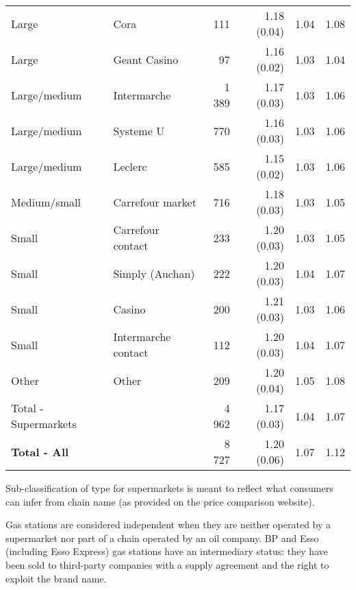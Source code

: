 \documentclass[english]{article}
\begin{document}
\begin{table}
\begin{threeparttable}
\begin{tabular}{lrrrrr}
    Large & \multicolumn{1}{l}{Cora} & 111   & 1.18 (0.04) & 1.04  & 1.08 \\
    Large & \multicolumn{1}{l}{Geant Casino} & 97    & 1.16 (0.02) & 1.03  & 1.04 \\
    Large/medium & \multicolumn{1}{l}{Intermarche} & 1 389 & 1.17 (0.03) & 1.03  & 1.06 \\
    Large/medium & \multicolumn{1}{l}{Systeme U} & 770   & 1.16 (0.03) & 1.03  & 1.06 \\
    Large/medium & \multicolumn{1}{l}{Leclerc} & 585   & 1.15 (0.02) & 1.03  & 1.06 \\
    Medium/small & \multicolumn{1}{l}{Carrefour market} & 716   & 1.18 (0.03) & 1.03  & 1.05 \\
    Small & \multicolumn{1}{l}{Carrefour contact} & 233   & 1.20 (0.03) & 1.03  & 1.05 \\
    Small & \multicolumn{1}{l}{Simply (Auchan)} & 222   & 1.20 (0.03) & 1.04  & 1.07 \\
    Small & \multicolumn{1}{l}{Casino} & 200   & 1.21 (0.03) & 1.03  & 1.06 \\
    Small & \multicolumn{1}{l}{Intermarche contact} & 112   & 1.20 (0.03) & 1.04  & 1.07 \\
    Other & \multicolumn{1}{l}{Other} & 209   & 1.20 (0.04) & 1.05  & 1.08 \\
    \midrule
    Total - Supermarkets &       & 4 962 & 1.17 (0.03) & 1.04  & 1.07 \\
    \midrule
    \textbf{Total - All} &       & 8 727 & 1.20 (0.06) & 1.07 & 1.12 \\
    \bottomrule

    \bottomrule
\end{tabular}
\begin{tablenotes}
			\small
			\item Sub-classification of type for supermarkets is meant to reflect what consumers can infer from chain name (as provided on the price comparison website).
      \item Gas stations are considered independent when they are neither operated by a supermarket nor part of a chain operated by an oil company. BP and Esso (including Esso Express) gas stations  have an intermediary status: they have been sold to third-party companies with a supply agreement and the right to exploit the brand name.
\end{tablenotes}
\end{threeparttable}
\end{table}
\end{document}
